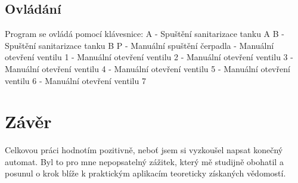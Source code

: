 \documentclass[12pt, a4paper]{article}
\begin{document}
\subsection{Ovládání}
Program se ovládá pomocí klávesnice: \newline 
A - Spuštění sanitarizace tanku A \newline 
B - Spuštění sanitarizace tanku B \newline 
P - Manuální spuštění čerpadla  - Manuální otevření ventilu 1  - Manuální otevření ventilu 2  - Manuální otevření ventilu 3  - Manuální otevření ventilu 4  - Manuální otevření ventilu 5  - Manuální otevření ventilu 6  - Manuální otevření ventilu 7 \newline 


\section{Závěr}
Celkovou práci hodnotím pozitivně, neboť jsem si vyzkoušel napsat konečný automat. Byl to pro mne nepopsatelný zážitek, který mě studijně obohatil a posunul o krok blíže k praktickým aplikacím teoreticky získaných vědomostí. 
\end{document}
